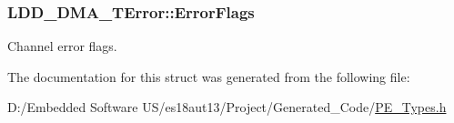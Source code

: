 \subsubsection[{Error\+Flags}]{ L\+D\+D\+\_\+\+D\+M\+A\+\_\+\+T\+Error\+::\+Error\+Flags}\label{struct_l_d_d___d_m_a___t_error_a9dd0a645e1763b4daa0058b1b29c4ad7}
Channel error flags. 

The documentation for this struct was generated from the following file\+:\begin{DoxyCompactItemize}
\item 
D\+:/\+Embedded Software U\+S/es18aut13/\+Project/\+Generated\+\_\+\+Code/\hyperlink{_p_e___types_8h}{P\+E\+\_\+\+Types.\+h}\end{DoxyCompactItemize}
